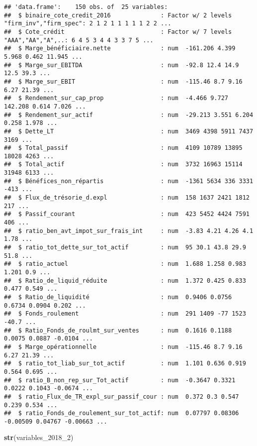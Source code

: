 \documentclass[
]{article}
\newenvironment{Shaded}{\begin{snugshade}}{\end{snugshade}}
\newcommand{\DecValTok}[1]{\textcolor[rgb]{0.00,0.00,0.81}{#1}}
\newcommand{\KeywordTok}[1]{\textcolor[rgb]{0.13,0.29,0.53}{\textbf{#1}}}
\newcommand{\NormalTok}[1]{#1}
\begin{document}
\begin{verbatim}
## 'data.frame':    150 obs. of  25 variables:
##  $ binaire_cote_credit_2016              : Factor w/ 2 levels "firm_inv","firm_spec": 2 1 2 1 1 1 1 1 2 2 ...
##  $ Cote_crédit                           : Factor w/ 7 levels "AAA","AA","A",..: 6 4 5 3 4 4 3 3 7 5 ...
##  $ Marge_bénéficiaire.nette              : num  -161.206 4.399 5.968 0.462 11.945 ...
##  $ Marge_sur_EBITDA                      : num  -92.8 12.4 14.9 12.5 39.3 ...
##  $ Marge_sur_EBIT                        : num  -115.46 8.7 9.16 6.27 21.39 ...
##  $ Rendement_sur_cap_prop                : num  -4.466 9.727 142.208 0.614 7.026 ...
##  $ Rendement_sur_actif                   : num  -29.213 3.551 6.204 0.258 1.978 ...
##  $ Dette_LT                              : num  3469 4398 5911 7437 3169 ...
##  $ Total_passif                          : num  4109 10789 13895 18028 4263 ...
##  $ Total_actif                           : num  3732 16963 15114 31948 6133 ...
##  $ Bénéfices_non_répartis                : num  -1361 5634 336 3331 -413 ...
##  $ Flux_de_trésorie_d.expl               : num  158 1637 2421 1812 217 ...
##  $ Passif_courant                        : num  423 5452 4424 7591 406 ...
##  $ ratio_ben_avt_impot_sur_frais_int     : num  -3.83 4.21 4.26 4.1 1.78 ...
##  $ ratio_tot_dette_sur_tot_actif         : num  95 30.1 43.8 29.9 51.8 ...
##  $ ratio_actuel                          : num  1.688 1.258 0.983 1.201 0.9 ...
##  $ Ratio_de_liquid_réduite               : num  1.372 0.425 0.833 0.477 0.549 ...
##  $ Ratio_de_liquidité                    : num  0.9406 0.0756 0.6734 0.0904 0.202 ...
##  $ Fonds_roulement                       : num  291 1409 -77 1523 -40.7 ...
##  $ Ratio_Fonds_de_roulmt_sur_ventes      : num  0.1616 0.1188 0.0075 0.0887 -0.0104 ...
##  $ Marge_opérationnelle                  : num  -115.46 8.7 9.16 6.27 21.39 ...
##  $ ratio_tot_liab_sur_tot_actif          : num  1.101 0.636 0.919 0.564 0.695 ...
##  $ ratio_B_non_rep_sur_Tot_actif         : num  -0.3647 0.3321 0.0222 0.1043 -0.0674 ...
##  $ ratio_Flux_de_TR_expl_sur_passif_cour : num  0.372 0.3 0.547 0.239 0.534 ...
##  $ ratio_Fonds_de_roulement_sur_tot_actif: num  0.07797 0.08306 -0.00509 0.04767 -0.00663 ...
\end{verbatim}

\begin{Shaded}
\begin{Highlighting}[]
\KeywordTok{str}\NormalTok{(variables_}\DecValTok{2018}\NormalTok{_}\DecValTok{2}\NormalTok{)}
\end{Highlighting}
\end{Shaded}
\end{document}
